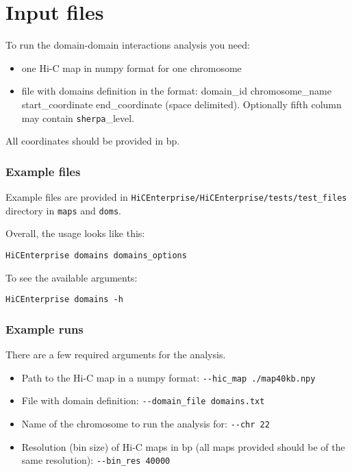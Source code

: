 \section{Input files}
\label{sec:input2}

To run the domain-domain interactions analysis you need:
\begin{itemize}
    \item one Hi-C map in numpy format for one chromosome
    \item file with domains definition in the format: domain\_id chromosome\_name start\_coordinate end\_coordinate (space
    delimited). Optionally fifth column may contain \lstinline{sherpa}\_level.
\end{itemize}

All coordinates should be provided in bp.

\subsubsection{Example files}
Example files are provided in \lstinline{HiCEnterprise/HiCEnterprise/tests/test_files} directory in \lstinline{maps} and \lstinline{doms}.

Overall, the usage looks like this:

\begin{lstlisting}
HiCEnterprise domains domains_options
\end{lstlisting}


To see the available arguments:
\begin{lstlisting}
HiCEnterprise domains -h
\end{lstlisting}


\subsubsection{Example runs}
There are a few required arguments for the analysis.
\begin{itemize}
    \item Path to the Hi-C map in a numpy format: \lstinline{--hic_map ./map40kb.npy}
    \item File with domain definition: \lstinline{--domain_file domains.txt}
    \item Name of the chromosome to run the analysis for: \lstinline{--chr 22}
    \item Resolution (bin size) of Hi-C maps in bp (all maps provided should be of the same resolution): \lstinline{--bin_res 40000}
\end{itemize}

